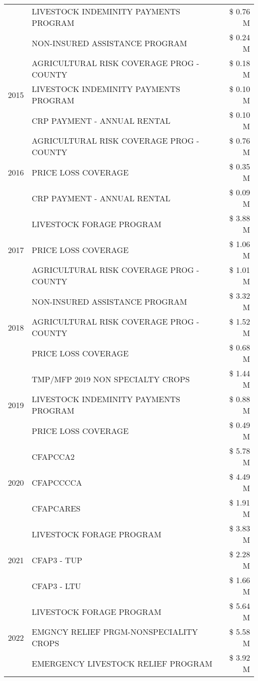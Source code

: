 \begin{tabular}{llr}
 & LIVESTOCK INDEMINITY PAYMENTS PROGRAM & \$ 0.76 M \\
 & NON-INSURED ASSISTANCE PROGRAM & \$ 0.24 M \\
\cline{1-3}
\multirow[t]{3}{*}{2015} & AGRICULTURAL RISK COVERAGE PROG - COUNTY & \$ 0.18 M \\
 & LIVESTOCK INDEMINITY PAYMENTS PROGRAM & \$ 0.10 M \\
 & CRP PAYMENT - ANNUAL RENTAL & \$ 0.10 M \\
\cline{1-3}
\multirow[t]{3}{*}{2016} & AGRICULTURAL RISK COVERAGE PROG - COUNTY & \$ 0.76 M \\
 & PRICE LOSS COVERAGE & \$ 0.35 M \\
 & CRP PAYMENT - ANNUAL RENTAL & \$ 0.09 M \\
\cline{1-3}
\multirow[t]{3}{*}{2017} & LIVESTOCK FORAGE PROGRAM & \$ 3.88 M \\
 & PRICE LOSS COVERAGE & \$ 1.06 M \\
 & AGRICULTURAL RISK COVERAGE PROG - COUNTY & \$ 1.01 M \\
\cline{1-3}
\multirow[t]{3}{*}{2018} & NON-INSURED ASSISTANCE PROGRAM & \$ 3.32 M \\
 & AGRICULTURAL RISK COVERAGE PROG - COUNTY & \$ 1.52 M \\
 & PRICE LOSS COVERAGE & \$ 0.68 M \\
\cline{1-3}
\multirow[t]{3}{*}{2019} & TMP/MFP 2019 NON SPECIALTY CROPS & \$ 1.44 M \\
 & LIVESTOCK INDEMINITY PAYMENTS PROGRAM & \$ 0.88 M \\
 & PRICE LOSS COVERAGE & \$ 0.49 M \\
\cline{1-3}
\multirow[t]{3}{*}{2020} & CFAPCCA2 & \$ 5.78 M \\
 & CFAPCCCCA & \$ 4.49 M \\
 & CFAPCARES & \$ 1.91 M \\
\cline{1-3}
\multirow[t]{3}{*}{2021} & LIVESTOCK FORAGE PROGRAM & \$ 3.83 M \\
 & CFAP3 - TUP & \$ 2.28 M \\
 & CFAP3 - LTU & \$ 1.66 M \\
\cline{1-3}
\multirow[t]{3}{*}{2022} & LIVESTOCK FORAGE PROGRAM & \$ 5.64 M \\
 & EMGNCY RELIEF PRGM-NONSPECIALITY CROPS & \$ 5.58 M \\
 & EMERGENCY LIVESTOCK RELIEF PROGRAM & \$ 3.92 M \\
\cline{1-3}
\bottomrule
\end{tabular}
